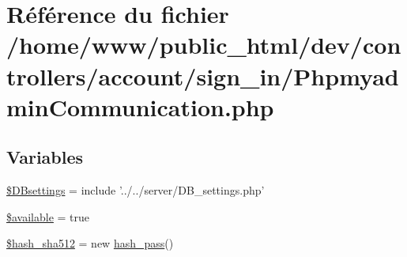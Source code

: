 \hypertarget{_phpmyadmin_communication_8php}{\section{Référence du fichier /home/www/public\-\_\-html/dev/controllers/account/sign\-\_\-in/\-Phpmyadmin\-Communication.php}
\label{_phpmyadmin_communication_8php}
}
\subsection*{Variables}
\begin{DoxyCompactItemize}
\item 
\hyperlink{_phpmyadmin_communication_8php_a9d97b484ee351b8e6034d74504996e9f}{\$\-D\-Bsettings} = include '../../server/D\-B\-\_\-settings.\-php'
\item 
\hyperlink{_phpmyadmin_communication_8php_acbf7bb4d49f2f2ff4394b7cb4a4b98d0}{\$available} = true
\item 
\hyperlink{_phpmyadmin_communication_8php_a74c430dee86586ad77d12b88324d0837}{\$hash\-\_\-sha512} = new \hyperlink{classhash__pass}{hash\-\_\-pass}()
\end{DoxyCompactItemize}


